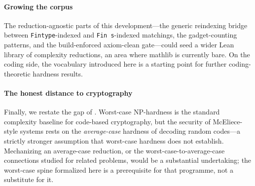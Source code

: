 \documentclass[sigplan,review,anonymous]{acmart}
\begin{document}
\paragraph{Growing the corpus} The reduction-agnostic parts of this development---the generic reindexing
bridge between \lstinline{Fintype}-indexed and \lstinline{Fin s}-indexed matchings, the gadget-counting
patterns, and the build-enforced axiom-clean gate---could seed a wider Lean library of complexity reductions, an
area where mathlib is currently bare. On the coding side, the vocabulary introduced here is a starting point for
further coding-theoretic hardness results.

\paragraph{The honest distance to cryptography} Finally, we restate the gap of . Worst-case
NP-hardness is the standard complexity baseline for code-based cryptography, but the security of McEliece-style
systems rests on the \emph{average-case} hardness of decoding random codes---a strictly stronger assumption that
worst-case hardness does not establish. Mechanizing an average-case reduction, or the worst-case-to-average-case
connections studied for related problems, would be a substantial undertaking; the worst-case spine formalized
here is a prerequisite for that programme, not a substitute for it.



\end{document}
